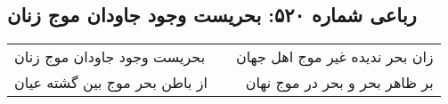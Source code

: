 \begin{center}
\section*{رباعی شماره ۵۲۰: بحریست وجود جاودان موج زنان}
\label{sec:sh520}
\begin{longtable}{l p{0.5cm} r}
بحریست وجود جاودان موج زنان
&&
زان بحر ندیده غیر موج اهل جهان
\\
از باطن بحر موج بین گشته عیان
&&
بر ظاهر بحر و بحر در موج نهان
\\
\end{longtable}
\end{center}
